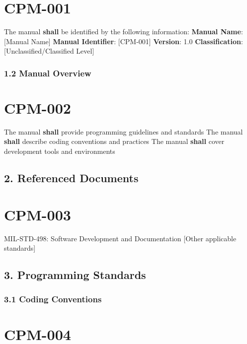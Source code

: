 \section{CPM-001}\label{CPM-001}

The manual \textbf{shall} be identified by the following information:
\textbf{Manual Name}: [Manual Name]
\textbf{Manual Identifier}: [CPM-001]
\textbf{Version}: 1.0
\textbf{Classification}: [Unclassified/Classified Level]

\subsubsection{1.2 Manual Overview}

\section{CPM-002}\label{CPM-002}

The manual \textbf{shall} provide programming guidelines and standards
The manual \textbf{shall} describe coding conventions and practices
The manual \textbf{shall} cover development tools and environments

\subsection{2. Referenced Documents}

\section{CPM-003}\label{CPM-003}

MIL-STD-498: Software Development and Documentation
[Other applicable standards]\\

\subsection{3. Programming Standards}

\subsubsection{3.1 Coding Conventions}

\section{CPM-004}\label{CPM-004}

